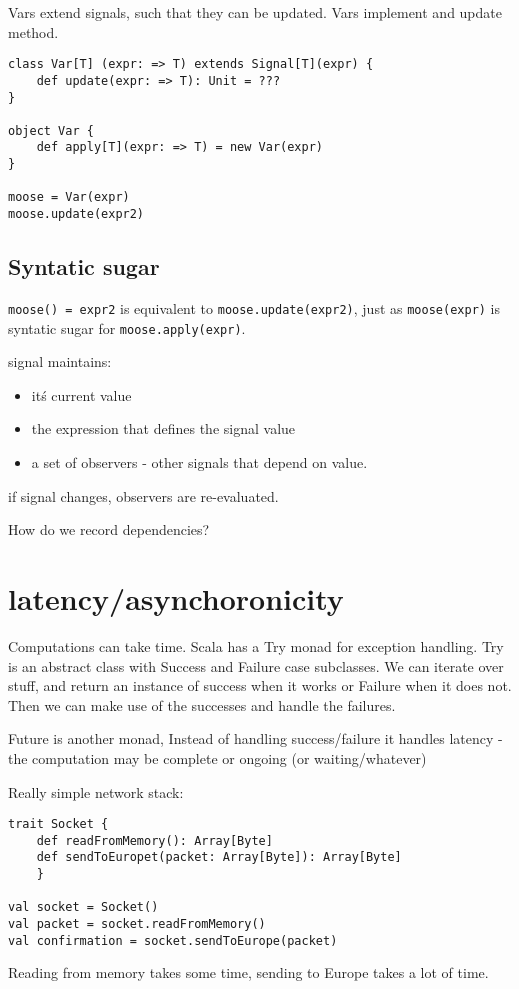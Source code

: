 Vars extend signals, such that they can be updated. Vars implement and update method.

\begin{lstlisting}
class Var[T] (expr: => T) extends Signal[T](expr) {
    def update(expr: => T): Unit = ???
}

object Var { 
    def apply[T](expr: => T) = new Var(expr)
}

moose = Var(expr)
moose.update(expr2)
\end{lstlisting}

\subsection{Syntatic sugar}
\lstinline|moose() = expr2| is equivalent to \lstinline|moose.update(expr2)|, just as \lstinline|moose(expr)| is syntatic sugar for \lstinline|moose.apply(expr)|.


signal maintains:
\begin{itemize}
\item it\'s current value
\item the expression that defines the signal value
\item a set of observers - other signals that depend on value.
\end{itemize}
if signal changes, observers are re-evaluated.


How do we record dependencies?

\section{latency/asynchoronicity}
Computations can take time. 
Scala has a Try monad for exception handling. Try is an abstract class with Success and Failure case subclasses. We can iterate over stuff, and return an instance of success when it works or Failure when it does not. Then we can make use of the successes and handle the failures.

Future is another monad, Instead of handling success/failure it handles latency - the computation may be complete or ongoing (or waiting/whatever)

Really simple network stack:
\begin{lstlisting}
trait Socket {
	def readFromMemory(): Array[Byte]
	def sendToEuropet(packet: Array[Byte]): Array[Byte]
	}

val socket = Socket()
val packet = socket.readFromMemory()
val confirmation = socket.sendToEurope(packet)

\end{lstlisting}
Reading from memory takes some time, sending to Europe takes a lot of time.

